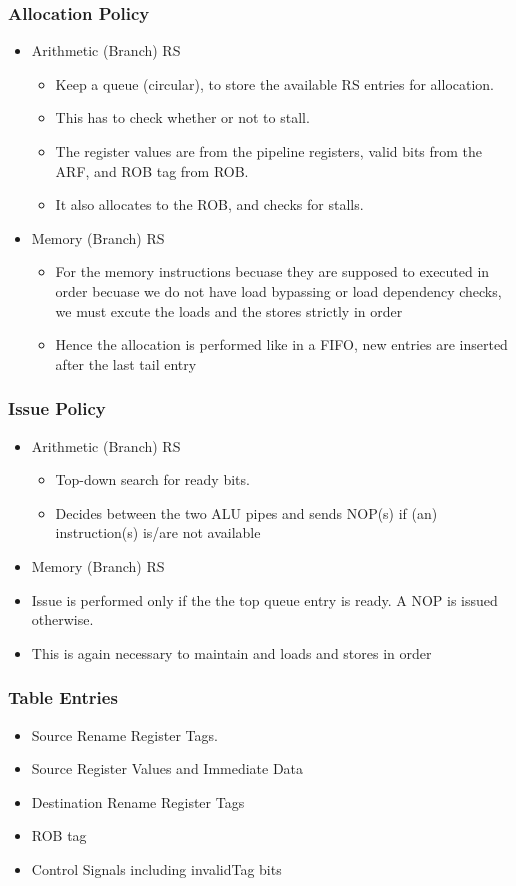 \documentclass{article}
\begin{document}
\subsubsection{Allocation Policy}
\begin{itemize}
\item Arithmetic (Branch) RS
\begin{itemize}
\item Keep a queue (circular), to store the available RS entries for allocation.
\item This has to check whether or not to stall.
\item The register values are from the pipeline registers, valid bits from the ARF, and ROB tag from ROB.
\item It also allocates to the ROB, and checks for stalls.
\end{itemize}
\item Memory (Branch) RS
\begin{itemize}
\item For the memory instructions becuase they are supposed to executed in order becuase we do not have load bypassing or load dependency checks, we must excute the loads and the stores strictly in order
\item Hence the allocation is performed like in a FIFO, new entries are inserted after the last tail entry
\end{itemize}
\end{itemize}
\subsubsection{Issue Policy}
\begin{itemize}
\item Arithmetic (Branch) RS
\begin{itemize}
\item Top-down search for ready bits.
\item Decides between the two ALU pipes and sends NOP(s) if (an) instruction(s) is/are not available
\end{itemize}
\item Memory (Branch) RS
\item Issue is performed only if the the top queue entry is ready. A NOP is issued otherwise.
\item This is again necessary to maintain and loads and stores in order
\end{itemize}
\subsubsection{Table Entries}
\begin{itemize}
\item Source Rename Register Tags.
\item Source Register Values and Immediate Data
\item Destination Rename Register Tags
\item ROB tag
\item Control Signals including invalidTag bits
\end{itemize}
\end{document}
